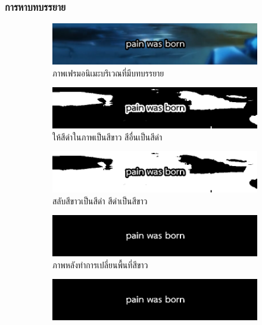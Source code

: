 \documentclass[xcolor=dvipsnames, xetex,serif]{beamer}
\numberwithin{equation}{section}
\begin{document}
		\begin{frame}
			\frametitle{การหาบทบรรยาย}
			\begin{figure}[H]
				\begin{subfigure}{0.4\linewidth}
					\centering
					\includegraphics[width=0.8\linewidth]{images/subtitle_detection/detection-original.png}
					\caption{ภาพเฟรมอนิเมะบริเวณที่มีบทบรรยาย}
				\end{subfigure}
				\begin{subfigure}{0.4\linewidth}
					\centering
					\includegraphics[width=0.8\linewidth]{images/subtitle_detection/detection-threshold.png}
					\caption{ให้สีดำในภาพเป็นสีขาว สีอื่นเป็นสีดำ }
				\end{subfigure}
				\begin{subfigure}{0.4\linewidth}
					\centering
					\includegraphics[width=0.8\linewidth]{images/subtitle_detection/detection-inverse.png}
					\caption{สลับสีขาวเป็นสีดำ สีดำเป็นสีขาว}
				\end{subfigure}
				\begin{subfigure}{0.4\linewidth}
					\centering
					\includegraphics[width=0.8\linewidth]{images/subtitle_detection/detection-blackfill.png}
					\caption{ภาพหลังทำการเปลี่ยนพื้นที่สีขาว}
				\end{subfigure}
				\begin{subfigure}{0.4\linewidth}
					\centering
					\includegraphics[width=0.8\linewidth]{images/subtitle_detection/detection-erode-opening.png}

\end{subfigure}
\end{figure}
\end{frame}
\end{document}
